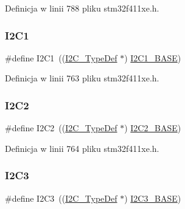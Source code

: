 Definicja w linii 788 pliku stm32f411xe.\+h.

\mbox{\label{group___peripheral__declaration_gab45d257574da6fe1f091cc45b7eda6cc}} 
\subsubsection{\texorpdfstring{I2\+C1}{I2C1}}
{\footnotesize\ttfamily \#define I2\+C1~((\hyperlink{struct_i2_c___type_def}{I2\+C\+\_\+\+Type\+Def} $\ast$) \hyperlink{group___peripheral__memory__map_gacd72dbffb1738ca87c838545c4eb85a3}{I2\+C1\+\_\+\+B\+A\+SE})}



Definicja w linii 763 pliku stm32f411xe.\+h.

\mbox{\label{group___peripheral__declaration_gafa60ac20c1921ef1002083bb3e1f5d16}} 
\subsubsection{\texorpdfstring{I2\+C2}{I2C2}}
{\footnotesize\ttfamily \#define I2\+C2~((\hyperlink{struct_i2_c___type_def}{I2\+C\+\_\+\+Type\+Def} $\ast$) \hyperlink{group___peripheral__memory__map_ga04bda70f25c795fb79f163b633ad4a5d}{I2\+C2\+\_\+\+B\+A\+SE})}



Definicja w linii 764 pliku stm32f411xe.\+h.

\mbox{\label{group___peripheral__declaration_ga1489b37ed2bca9d9c659119590583bda}} 
\subsubsection{\texorpdfstring{I2\+C3}{I2C3}}
{\footnotesize\ttfamily \#define I2\+C3~((\hyperlink{struct_i2_c___type_def}{I2\+C\+\_\+\+Type\+Def} $\ast$) \hyperlink{group___peripheral__memory__map_ga4e8b9198748235a1729e1e8f8f24983b}{I2\+C3\+\_\+\+B\+A\+SE})}



